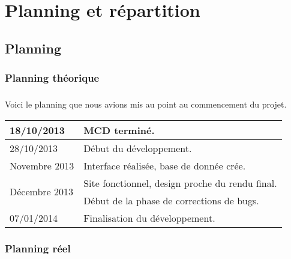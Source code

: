 \chapter{Planning et répartition}

\section{Planning}
    \subsection{Planning théorique}
        \paragraph{}
            Voici le planning que nous avions mis au point au commencement du 
            projet.
        \begin{center}
            \begin{tabular}{|l|l|}
                \hline
                18/10/2013 & MCD terminé. \\
                \hline
                28/10/2013 & Début du développement. \\
                \hline
                Novembre 2013 & Interface réalisée, base de donnée crée. \\
                \hline
                \multirow{2}{*}{Décembre 2013}
                    & Site fonctionnel, design proche du rendu final. \\
                    & Début de la phase de corrections de bugs. \\
                \hline
                07/01/2014 & Finalisation du développement. \\
                \hline
            \end{tabular}
        \end{center}
    \subsection{Planning réel}
